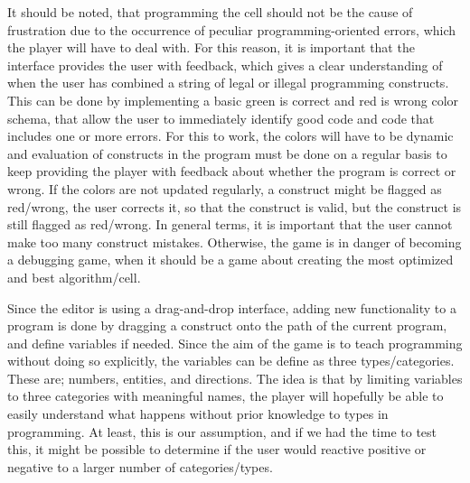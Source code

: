 It should be noted, that programming the cell should not be the cause of frustration due to the occurrence of peculiar programming-oriented errors, which the player will have to deal with.
For this reason, it is important that the interface provides the user with feedback, which gives a clear understanding of when the user has combined a string of legal or illegal programming constructs.
This can be done by implementing a basic green is correct and red is wrong color schema, that allow the user to immediately identify good code and code that includes one or more errors.
For this to work, the colors will have to be dynamic and evaluation of constructs in the program must be done on a regular basis to keep providing the player with feedback about whether the program is correct or wrong.
If the colors are not updated regularly, a construct might be flagged as red/wrong, the user corrects it, so that the construct is valid, but the construct is still flagged as red/wrong.
In general terms, it is important that the user cannot make too many construct mistakes.
Otherwise, the game is in danger of becoming a debugging game, when it should be a game about creating the most optimized and best algorithm/cell.\newline

Since the editor is using a drag-and-drop interface, adding new functionality to a program is done by dragging a construct onto the path of the current program, and define variables if needed.
Since the aim of the game is to teach programming without doing so explicitly, the variables can be define as three types/categories.
These are; numbers, entities, and directions.
The idea is that by limiting variables to three categories with meaningful names, the player will hopefully be able to easily understand what happens without prior knowledge to types in programming.
At least, this is our assumption, and if we had the time to test this, it might be possible to determine if the user would reactive positive or negative to a larger number of categories/types.

